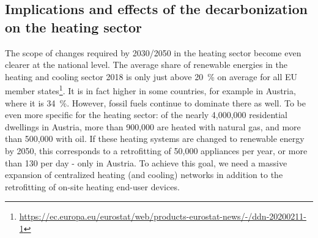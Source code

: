 \subsection{Implications and effects of the decarbonization on the heating sector}
The scope of changes required by 2030/2050 in the heating sector become even clearer at the national level. The average share of renewable energies in the heating and cooling sector 2018 is only just above \SI{20}{\%} on average for all EU member states\footnote{\url{https://ec.europa.eu/eurostat/web/products-eurostat-news/-/ddn-20200211-1}}. It is in fact higher in some countries, for example in Austria, where it is \SI{34}{\%}. However, fossil fuels continue to dominate there as well. To be even more specific for the heating sector: of the nearly 4,000,000 residential dwellings in Austria, more than 900,000 are heated with natural gas, and more than 500,000 with oil. If these heating systems are changed to renewable energy by 2050, this corresponds to a retrofitting of 50,000 appliances per year, or more than 130 per day - only in Austria. To achieve this goal, we need a massive expansion of centralized heating (and cooling) networks in addition to the retrofitting of on-site heating end-user devices.\vspace{0.3cm}

